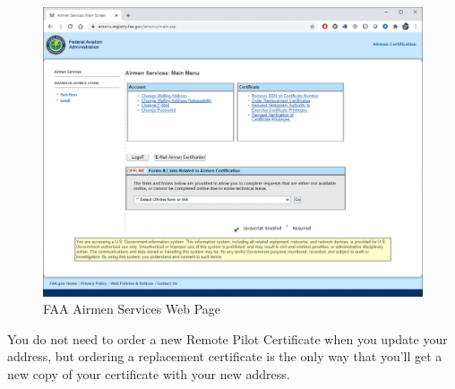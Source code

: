 \documentclass[
]{book}
\begin{document}
\begin{figure}

{\centering \includegraphics[width=0.7\linewidth]{images/airmen-services} 

}

\caption{FAA Airmen Services Web Page}\label{fig:airmen-services}
\end{figure}

You do not need to order a new Remote Pilot Certificate when you update your address, but ordering a replacement certificate is the only way that you'll get a new copy of your certificate with your new address.
\end{document}
